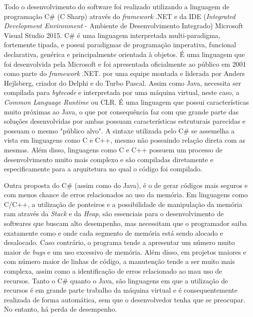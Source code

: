 Todo o desenvolvimento do software foi realizado utilizando a linguagem de programação C\# (C Sharp) através do \textit{framework} .NET e da IDE (\textit{Integrated Development Environment} -  Ambiente de Desenvolvimento Integrado) Microsoft Visual Studio 2015. C\# é uma linguagem interpretada multi-paradigma, fortemente tipada, e possui paradigmas de programação imperativa, funcional declarativa, genérica e principalmente orientada à objetos. É uma linguagem que foi desenvolvida pela Microsoft e foi apresentada oficialmente ao público em 2001 como parte do \textit{framework} .NET. por uma equipe montada e liderada por Anders Hejlsberg, criador do Delphi e do Turbo Pascal. Assim como Java, necessita ser compilada para \textit{bytecode} e interpretada por uma máquina virtual, neste caso, a \textit{Common Language Runtime} ou CLR. É uma linguagem que possui características muito próximas ao Java, o que por consequência faz com que grande parte das soluções desenvolvidas por ambas possuam características estruturais parecidas e possuam o mesmo "público alvo". A sintaxe utilizada pelo C\# se assemelha a vista em linguagens como C e C++, mesmo não possuindo relação direta com as mesmas. Além disso, linguagens como C e C++ possuem um processo de desenvolvimento muito mais complexo e são compiladas diretamente e especificamente para a arquitetura no qual o código foi compilado. 

Outra proposta do C\# (assim como do Java), é o de gerar códigos mais seguros e com menos chance de erros relacionados ao uso da memória. Em linguagens como C/C++, a utilização de ponteiros e a possibilidade de manipulação da memória ram através da \textit{Stack} e da \textit{Heap}, são essenciais para o desenvolvimento de softwares que buscam alto desempenho, mas necessitam que o programador saiba exatamente como e onde cada segmento de memória está sendo alocado e desalocado. Caso contrário, o programa tende a apresentar um número muito maior de \textit{bugs} e um uso excessivo de memória. Além disso, em projetos maiores e com número maior de linhas de código, a manutenção tende a ser muito mais complexa, assim como a identificação de erros relacionado ao mau uso de recursos. Tanto o C\# quanto o Java, são linguagens em que a utilização de recursos é em grande parte trabalho da máquina virtual e é consequentemente realizada de forma automática, sem que o desenvolvedor tenha que se preocupar. No entanto, há perda de desempenho.

